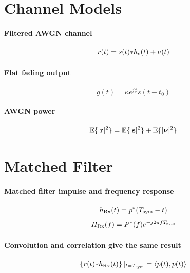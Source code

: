 
\section*{Channel Models}

\paragraph{Filtered AWGN channel}
\begin{equation}
r(t) = s(t) {\ast} h_c(t) + \nu(t)
\label{eq:filtered_awgn_channel}
\end{equation}

\paragraph{Flat fading output}
\begin{equation}
g(t) = \kappa e^{j \phi} s(t-t_0)
\label{eq:flatFadingOutput}
\end{equation}

\paragraph{AWGN power}
\begin{equation}
\mathbb{E}\{|{\textbf r}|^2\}= \mathbb{E}\{|{\textbf s}|^2\}+\mathbb{E}\{|{\boldsymbol{\nu}}|^2\}
\label{eq:awgn_power}
\end{equation}

\section*{Matched Filter}

\paragraph{Matched filter impulse and frequency response}
\begin{equation}
h_{\textrm{Rx}}(t)=p^*({T_{\textrm{sym}}}-t)
\label{eq:matchedFilter}
\end{equation}
\begin{equation}
H_{\textrm{Rx}}(f)=P^*(f)e^{-j2\pi f {T_{\textrm{sym}}}}
\end{equation}

\paragraph{Convolution and correlation give the same result}
\begin{equation}
\left\{ r(t) {\ast} h_{\textrm{Rx}}(t) \right\} |_{t={T_{\textrm{sym}}}} = \langle p(t),p(t)\rangle
\label{eq:convCorrGiveSameResult}
\end{equation}

